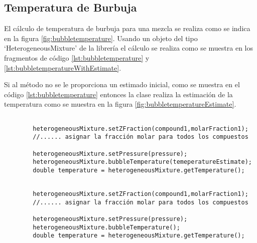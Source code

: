 \subsection{Temperatura de Burbuja}\label{subsec:bubbletemperature}

	El cálculo de temperatura de burbuja para una mezcla se realiza como se indica en la figura \ref{fig:bubbletemperature}. Usando un objeto del tipo `HeterogeneousMixture' de la librería \Materia el cálculo se realiza como se muestra en los fragmentos de código \ref{lst:bubbletemperature} y \ref{lst:bubbletemperatureWithEstimate}.

	Si al método no se le proporciona un estimado inicial, como se muestra en el código \ref{lst:bubbletemperature} entonces la clase realiza la estimación de la temperatura como se muestra en la figura \ref{fig:bubbletemperatureEstimate}. 

	\begin{lstlisting}[label={lst:bubbletemperatureWithEstimate},caption={Cálculo de la temperatura de burbuja proporcionando un estimado inicial.}]

		heterogeneousMixture.setZFraction(compound1,molarFraction1);
		//...... asignar la fracción molar para todos los compuestos

		heterogeneousMixture.setPressure(pressure);
		heterogeneousMixture.bubbleTemperature(temeperatureEstimate);
		double temperature = heterogeneousMixture.getTemperature();
	\end{lstlisting}


	\begin{lstlisting}[label={lst:bubbletemperature},caption={Cálculo de la temperatura de burbuja.}]

		heterogeneousMixture.setZFraction(compound1,molarFraction1);
		//...... asignar la fracción molar para todos los compuestos

		heterogeneousMixture.setPressure(pressure);
		heterogeneousMixture.bubbleTemperature();
		double temperature = heterogeneousMixture.getTemperature();
	\end{lstlisting}


\begin{figure}[!h]
	\centering	
	\caption{}\label{fig:bubblePressure}
\end{figure}

